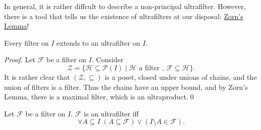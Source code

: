 \documentclass[notoc,notitlepage]{tufte-book}
\begin{document}
In general, it is rather diffcult to describe a non-principal ultrafilter. However, there is a tool that tells us the existence of ultrafilters at our disposal: \hyperref[item:zorn_s_lemma]{Zorn's Lemma}!

\begin{lemma}\label{lemma:existence_of_ultrafilters}
  Every filter on $I$ extends to an ultrafilter on $I$.
\end{lemma}

\begin{proof}
  Let $\mathcal{F}$ be a filter on $I$. Consider
  \begin{equation*}
    \mathcal{Z} = \{ \mathcal{H} \subseteq \mathcal{P}(I) \mid \mathcal{H} \text{ a filter }, \, \mathcal{F} \subseteq \mathcal{H} \}.
  \end{equation*}
  It is rather clear that $(\mathcal{Z}, \subseteq)$ is a poset, closed under unions of chains, and the union of filters is a filter. Thus the chains have an upper bound, and by Zorn's Lemma, there is a maximal filter, which is an ultraproduct.\qed\
\end{proof}

\begin{lemma}\label{lemma:equivalent_characterization_of_an_ultrafilter}
  Let $\mathcal{F}$ be a filter on $I$. $\mathcal{F}$ is an ultrafilter iff
  \begin{equation*}
    \forall A \subseteq I \; (A \subseteq \mathcal{F}) \lor (I \setminus A \in \mathcal{F}).
  \end{equation*}
\end{lemma}
\end{document}
